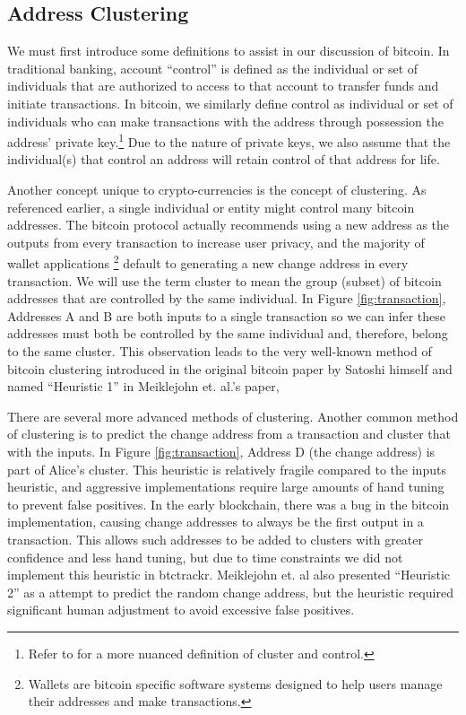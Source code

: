 \documentclass[10pt, letterpaper, twocolumn, twoside]{article}
\begin{document}
\subsection{Address Clustering}

We must first introduce some definitions to assist in our discussion of bitcoin. In traditional banking, account ``control'' is defined as the individual or set of individuals that are authorized to access to that account to transfer funds and initiate transactions. In bitcoin, we similarly define control as individual or set of individuals who can make transactions with the address through possession the address' private key.\footnote{Refer to \cite{fistfull} for a more nuanced definition of cluster and control.} Due to the nature of private keys, we also assume that the individual(s) that control an address will retain control of that address for life. 

Another concept unique to crypto-currencies is the concept of clustering. As referenced earlier, a single individual or entity might control many bitcoin addresses. The bitcoin protocol actually recommends using a new address as the outputs from every transaction to increase user privacy, and the majority of wallet applications \footnote{Wallets are bitcoin specific software systems designed to help users manage their addresses and make transactions.} default to generating a new change address in every transaction.  We will use the term cluster to mean the group (subset) of bitcoin addresses that are controlled by the same individual. In Figure \ref{fig:transaction}, Addresses A and B are both inputs to a single transaction so we can infer these addresses must both be controlled by the same individual and, therefore, belong to the same cluster. This observation leads to the very well-known method of bitcoin clustering introduced in the original bitcoin paper by Satoshi himself\cite{bitcoin} and named ``Heuristic 1'' in Meiklejohn et. al.'s paper\cite{fistfull}, 

There are several more advanced methods of clustering.  Another common method of clustering is to predict the change address from a transaction and cluster that with the inputs. In Figure \ref{fig:transaction}, Address D (the change address) is part of Alice's cluster. This heuristic is relatively fragile compared to the inputs heuristic, and aggressive implementations require large amounts of hand tuning to prevent false positives. In the early blockchain, there was a bug in the bitcoin implementation, causing change addresses to always be the first output in a transaction. This allows such addresses to be added to clusters with greater confidence and less hand tuning, but due to time constraints we did not implement this heuristic in btctrackr. Meiklejohn et. al also presented ``Heuristic 2'' as a attempt to predict the random change address, but the heuristic required significant human adjustment to avoid excessive false positives.
\end{document}
